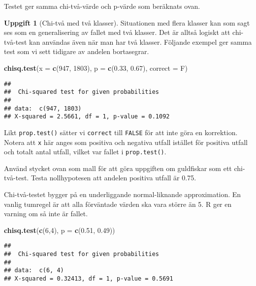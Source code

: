 \documentclass[
]{book}
\newenvironment{Shaded}{\begin{snugshade}}{\end{snugshade}}
\newcommand{\AttributeTok}[1]{\textcolor[rgb]{0.13,0.29,0.53}{#1}}
\newcommand{\DecValTok}[1]{\textcolor[rgb]{0.00,0.00,0.81}{#1}}
\newcommand{\FloatTok}[1]{\textcolor[rgb]{0.00,0.00,0.81}{#1}}
\newcommand{\FunctionTok}[1]{\textcolor[rgb]{0.13,0.29,0.53}{\textbf{#1}}}
\newcommand{\NormalTok}[1]{#1}
\theoremstyle{definition}
\theoremstyle{definition}
\theoremstyle{definition}
\newtheorem{exercise}{Uppgift}[chapter]
\theoremstyle{definition}
\theoremstyle{remark}
\begin{document}
Testet ger samma chi-två-värde och p-värde som beräknats ovan.

\begin{exercise}[Chi-två med två klasser]
Situationen med flera klasser kan som sagt ses som en generalisering av fallet med två klasser. Det är alltså logiskt att chi-två-test kan användas även när man har två klasser. Följande exempel ger samma test som vi sett tidigare av andelen bortasegrar.

\begin{Shaded}
\begin{Highlighting}[]
\FunctionTok{chisq.test}\NormalTok{(}\AttributeTok{x =} \FunctionTok{c}\NormalTok{(}\DecValTok{947}\NormalTok{, }\DecValTok{1803}\NormalTok{), }\AttributeTok{p =} \FunctionTok{c}\NormalTok{(}\FloatTok{0.33}\NormalTok{, }\FloatTok{0.67}\NormalTok{), }\AttributeTok{correct =}\NormalTok{ F)}
\end{Highlighting}
\end{Shaded}

\begin{verbatim}
## 
##  Chi-squared test for given probabilities
## 
## data:  c(947, 1803)
## X-squared = 2.5661, df = 1, p-value = 0.1092
\end{verbatim}

Likt \texttt{prop.test()} sätter vi \texttt{correct} till \texttt{FALSE} för att inte göra en korrektion. Notera att \texttt{x} här anges som positiva och negativa utfall istället för positiva utfall och totalt antal utfall, vilket var fallet i \texttt{prop.test()}.

Använd stycket ovan som mall för att göra uppgiften om guldfiskar som ett chi-två-test. Testa nollhypotesen att andelen positiva utfall är 0.75.
\end{exercise}

Chi-två-testet bygger på en underliggande normal-liknande approximation. En vanlig tumregel är att alla förväntade värden ska vara större än 5. R ger en varning om så inte är fallet.

\begin{Shaded}
\begin{Highlighting}[]
\FunctionTok{chisq.test}\NormalTok{(}\FunctionTok{c}\NormalTok{(}\DecValTok{6}\NormalTok{,}\DecValTok{4}\NormalTok{), }\AttributeTok{p =} \FunctionTok{c}\NormalTok{(}\FloatTok{0.51}\NormalTok{, }\FloatTok{0.49}\NormalTok{))}
\end{Highlighting}
\end{Shaded}

\begin{verbatim}
## 
##  Chi-squared test for given probabilities
## 
## data:  c(6, 4)
## X-squared = 0.32413, df = 1, p-value = 0.5691
\end{verbatim}
\end{document}
